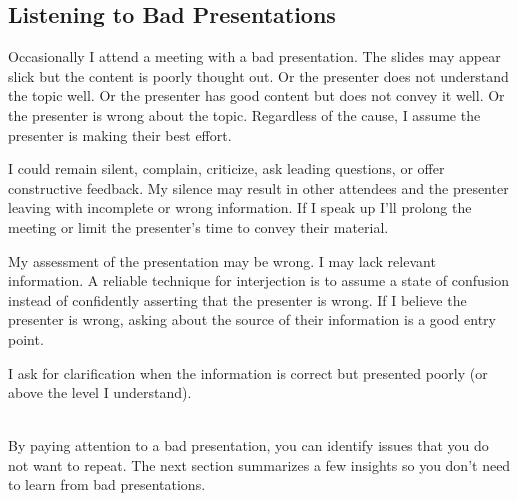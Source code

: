 \subsection*{Listening to Bad Presentations\label{sec:bad-presentations}}

Occasionally I attend a meeting with a bad presentation. The slides may appear slick but the content is poorly thought out. Or the presenter does not understand the topic well. Or the presenter has good content but does not convey it well. Or the presenter is wrong about the topic. Regardless of the cause, I assume the presenter is making their best effort. 

I could remain silent, complain, criticize, ask leading questions, or offer constructive feedback. My silence may result in other attendees and the presenter leaving with incomplete or wrong information. If I speak up I'll prolong the meeting or limit the presenter's time to convey their material. 

My assessment of the presentation may be wrong. I may lack relevant information. A reliable technique for interjection is to assume a state of confusion instead of confidently asserting that the presenter is wrong. 
If I believe the presenter is wrong, asking about the source of their information is a good entry point.

I ask for clarification when the information is correct but presented poorly (or above the level I understand). 

\ \\


By paying attention to a bad presentation, you can  identify issues that you do not want to repeat. The next section summarizes a few insights so you don't need to learn from bad presentations.